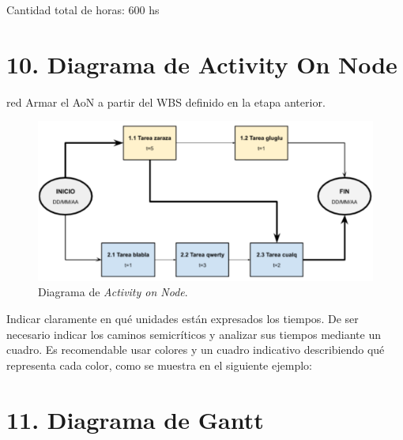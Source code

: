 \documentclass[
11pt, %
codirector, %
]{charter}
\begin{document}
Cantidad total de horas: 600 hs

\section{10. Diagrama de Activity On Node}
\label{sec:AoN}

\begin{consigna}{red}
Armar el AoN a partir del WBS definido en la etapa anterior. 



\end{consigna}

\begin{figure}[htpb]
\centering 
\includegraphics[width=.8\textwidth]{./Figuras/AoN.png}
\caption{Diagrama de \textit{Activity on Node}.}
\label{fig:AoN}
\end{figure}

Indicar claramente en qué unidades están expresados los tiempos.
De ser necesario indicar los caminos semicríticos y analizar sus tiempos mediante un cuadro.
Es recomendable usar colores y un cuadro indicativo describiendo qué representa cada color, como se muestra en el siguiente ejemplo:



\section{11. Diagrama de Gantt}
\label{sec:gantt}
\end{document}
